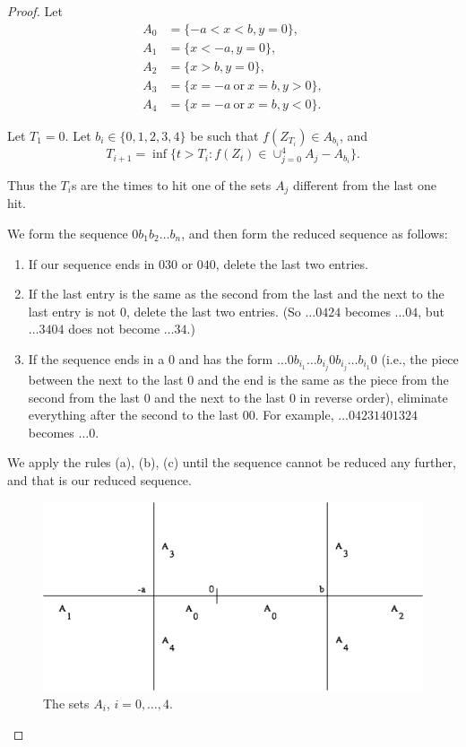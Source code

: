 \begin{proof}
Let
{\setlength{\abovedisplayskip}{0em}
\begin{align*}
    A_0 &= \{-a < x < b, y = 0\}, \\
    A_1 &= \{x < -a, y = 0\}, \\
    A_2 &= \{x > b, y = 0\}, \\
    A_3 &= \{x = -a~\text{or}~x = b, y > 0\}, \\
    A_4 &= \{x = -a~\text{or}~x = b, y < 0\}.
\end{align*}
}

Let $T_1 = 0$. Let $b_i \in \{0,1,2,3,4\}$ be such that $f(Z_{T_i}) \in A_{b_i}$, and
\[
    T_{i+1} = \inf\{t > T_i : f(Z_t) \in \cup_{j=0}^4 A_j - A_{b_i}\}.
\]

Thus the $T_i$s are the times to hit one of the sets $A_j$ different from the last one hit.


We form the sequence $0b_1b_2\ldots b_n$, and then form the reduced sequence as follows:
\begin{enumerate}
    \item If our sequence ends in $030$ or $040$, delete the last two entries.
    \item If the last entry is the same as the second from the last and the next to the last entry is not $0$, delete the last two entries. (So $\ldots 0424$ becomes $\ldots 04$, but $\ldots 3404$ does not become $\ldots 34$.)
    \mpagebreak
    \item If the sequence ends in a $0$ and has the form $\ldots 0b_{i_1}\ldots b_{i_j}0b_{i_j}\ldots b_{i_1}0$ (i.e., the piece between the next to the last $0$ and the end is the same as the piece from the second from the last $0$ and the next to the last $0$ in reverse order), eliminate everything after the second to the last 0$0$. For example, $\ldots 04231401324$ becomes $\ldots 0$.
\end{enumerate}

We apply the rules (a), (b), (c) until the sequence cannot be reduced any further, and that is our reduced sequence.


\bigskip
\begin{figure}[ht]
    \centering\includegraphics{Images/Img10.png}
    \caption{The sets $A_i$, $i=0,\ldots,4$.}
    \label{fig:ch5_2.1}
\end{figure}


\end{proof}
